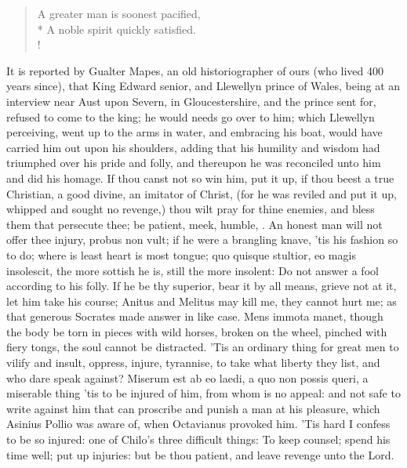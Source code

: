{\begin{latin}
\begin{verse}
\end{verse}%
\end{latin}%
\translationrule%
\begin{verse}%
A greater man is soonest pacified,\\*
A noble spirit quickly satisfied.\\!
\end{verse}%
%
It is reported by Gualter Mapes, an old historiographer of ours
(who lived 400 years since), that King Edward senior, and Llewellyn
prince of Wales, being at an interview near Aust upon Severn, in
Gloucestershire, and the prince sent for, refused to come to the king;
he would needs go over to him; which Llewellyn perceiving, went
up to the arms in water, and embracing his boat, would have carried him
out upon his shoulders, adding that his humility and wisdom had
triumphed over his pride and folly, and thereupon he was reconciled
unto him and did his homage. If thou canst not so win him, put it up,
if thou beest a true Christian, a good divine, an imitator of Christ,
(for he was reviled and put it up, whipped and sought no
revenge,) thou wilt pray for thine enemies, and bless them that
persecute thee; be patient, meek, humble, \etc{}. An honest man will not
offer thee injury, probus non vult; if he were a brangling knave, 'tis
his fashion so to do; where is least heart is most tongue; quo quisque
stultior, eo magis insolescit, the more sottish he is, still the more
insolent: Do not answer a fool according to his folly. If he be
thy superior, bear it by all means, grieve not at it, let him
take his course; Anitus and Melitus may kill me, they cannot hurt
me; as that generous Socrates made answer in like case. Mens immota
manet, though the body be torn in pieces with wild horses, broken on
the wheel, pinched with fiery tongs, the soul cannot be distracted.
'Tis an ordinary thing for great men to vilify and insult, oppress,
injure, tyrannise, to take what liberty they list, and who dare speak
against? Miserum est ab eo laedi, a quo non possis queri, a miserable
thing 'tis to be injured of him, from whom is no appeal: and not
safe to write against him that can proscribe and punish a man at his
pleasure, which Asinius Pollio was aware of, when Octavianus provoked
him. 'Tis hard I confess to be so injured: one of Chilo's three
difficult things: To keep counsel; spend his time well; put up
injuries: but be thou patient, and leave revenge unto the Lord.
}

